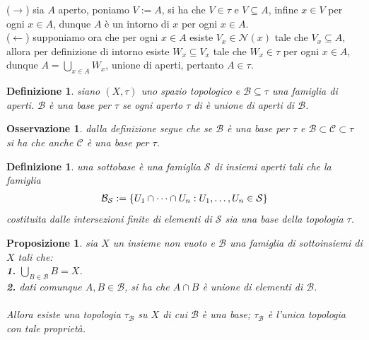 \documentclass[oneside, 11pt]{amsbook}
\makeatletter
\newcommand{\0}{{(0)}}
\newcommand{\3}{{(3)}}
\theoremstyle{colonplain}
\newtheorem{prop}[thm]{Proposizione}
\theoremstyle{colondefinition}
\newtheorem{defn}[thm]{Definizione}
\theoremstyle{colonremark}
\newtheorem{rmk}[thm]{Osservazione}
\numberwithin{equation}{chapter}
\renewcommand{\proofname}{Dimostrazione}
\renewenvironment{proof}[1][\proofname]{\par
  \pushQED{\qed}%
  \normalfont \topsep6\p@\@plus6\p@\relax
  \trivlist
  \item[\hskip\labelsep\bfseries #1:]\ignorespaces
}{%
  \popQED\endtrivlist\@endpefalse
}
\makeatother
\begin{document}
\begin{proof}
($\rightarrow$) sia $A$ aperto, poniamo $V := A$, si ha che $V \in \tau$ e $V \subseteq A$, infine $x \in V$ per ogni $x \in A$, dunque $A$ è un intorno di $x$ per ogni $x \in A$. \\
($\leftarrow$) supponiamo ora che per ogni $x \in A$ esiste $V_x \in \mathcal{N}(x)$ tale che $V_x \subseteq A$, allora per definizione di intorno esiste $W_x \subseteq V_x$ tale che $W_x \in \tau$ per ogni $x \in A$, dunque $A = \bigcup_{x \in A} W_x$, unione di aperti, pertanto $A \in \tau$.
\end{proof}
\begin{defn}
siano $(X, \tau)$ uno spazio topologico e $\mathcal{B} \subseteq \tau$ una famiglia di aperti. $\mathcal{B}$ è una \textit{base} per $\tau$ se ogni aperto $\tau$ di è unione di aperti di $\mathcal{B}$.
\end{defn}
\begin{rmk}
dalla definizione segue che se $\mathcal{B}$ è una base per $\tau$ e $\mathcal{B} \subset \mathcal{C} \subset \tau$ si ha che anche $\mathcal{C}$ è una base per $\tau$.
\end{rmk}
\begin{defn}
una \textit{sottobase} è una famiglia $\mathcal{S}$ di insiemi aperti tali che la famiglia
\begin{align}
    \mathcal{B}_\mathcal{S} := \{ U_1 \cap \dots \cap U_n : U_1, \dots , U_n \in \mathcal{S} \} \notag
\end{align}
costituita dalle intersezioni finite di elementi di $\mathcal{S}$ sia una base della topologia $\tau$.
\end{defn}
\begin{prop}
sia $X$ un insieme non vuoto e $\mathcal{B}$ una famiglia di sottoinsiemi di $X$ tali che: \\
\textbf{1.} $\bigcup_{B \in \mathcal{B}} B = X$. \\
\textbf{2.} dati comunque $A, B \in \mathcal{B}$, si ha che $A \cap B$ è unione di elementi di $\mathcal{B}$. \\ \\
Allora esiste una topologia $\tau_\mathcal{B}$ su $X$ di cui $\mathcal{B}$ è una base; $\tau_\mathcal{B}$ è l'unica topologia con tale proprietà.
\end{prop}
\end{document}
